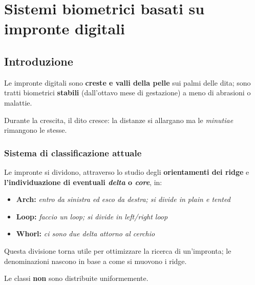 \chapter{Sistemi biometrici basati su impronte digitali}

\section{Introduzione}

Le impronte digitali sono \textbf{creste e valli della pelle} sui palmi delle dita;
sono tratti biometrici \textbf{stabili} (dall'ottavo mese di gestazione) a meno di abrasioni
o malattie.

\noindent Durante la crescita, il dito cresce: la distanze si allargano ma le 
\textit{minutiae} rimangono le stesse.

\subsection{Sistema di classificazione attuale}

Le impronte si dividono, attraverso lo studio degli \textbf{orientamenti dei ridge} e \textbf{l'individuazione
di eventuali \textit{delta} o \textit{core}}, in:
\begin{itemize}
    \item \textbf{Arch:} \textit{entro da sinistra ed esco da destra; si divide in plain e tented}
    \item \textbf{Loop:} \textit{faccio un loop; si divide in left/right loop}
    \item \textbf{Whorl:} \textit{ci sono due delta attorno al cerchio}
\end{itemize}
Questa divisione torna utile per ottimizzare la ricerca di un'impronta; le denominazioni
nascono in base a come si muovono i ridge.

\noindent Le classi \textbf{non} sono distribuite uniformemente.

